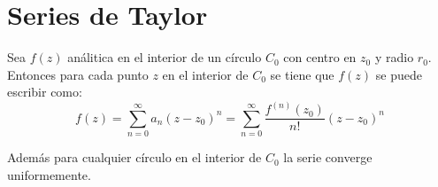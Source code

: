 \documentclass[12pt, fleqn]{report}                             %
\theoremstyle{break}                                            %
\begin{document}
            
                
                

        \clearpage
        \section{Series de Taylor}

            Sea $f(z)$ análitica en el interior de un círculo $C_0$ con centro en $z_0$
            y radio $r_0$. Entonces para cada punto $z$ en el interior de $C_0$ se tiene
            que $f(z)$ se puede escribir como:
            \begin{equation*}
                f(z)    
                    = \sum_{n=0}^\infty a_n (z-z_0)^n
                    = \sum_{n=0}^\infty \dfrac{f^{(n)}(z_0)}{n!} (z-z_0)^n
            \end{equation*}

            Además para cualquier círculo en el interior de $C_0$ la serie converge
            uniformemente.
\end{document}
